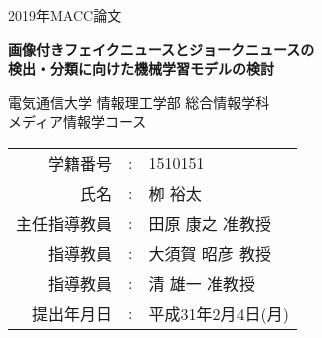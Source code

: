 \documentclass[a4paper,12pt,oneside,openany,uplatex]{jsbook}
\begin{document}
%
%
\frontmatter
\begin{titlepage}
  \vspace*{7mm}
  \begin{center}
    \Large{2019年MACC論文}\\

    \vspace{40truemm}

    \LARGE{\textbf{画像付きフェイクニュースとジョークニュースの\\検出・分類に向けた機械学習モデルの検討}}\\

    \vspace{30truemm}

    \Large{電気通信大学 情報理工学部 総合情報学科}\\
    \Large{メディア情報学コース}\\

    \vspace{15truemm}

    \begin{table*}[h]
        \centering
        \hspace*{4em}
        \begin{tabular}{rcl}
            \large{学籍番号}&\large{:}&\large{1510151} \\
            \large{氏名}&\large{:}&\large{栁 裕太} \vspace{5truemm} \\
            \large{主任指導教員}&\large{:}&\large{田原 康之 准教授} \vspace{5truemm} \\
            \large{指導教員}&\large{:}&\large{大須賀 昭彦 教授} \vspace{5truemm} \\
            \large{指導教員}&\large{:}&\large{清 雄一 准教授} \vspace{5truemm} \\
            \large{提出年月日}&\large{:}&\large{平成31年2月4日(月)} \\
        \end{tabular}
    \end{table*}
  \end{center}
\end{titlepage}
%


\tableofcontents
%
\mainmatter{}










\newpage
\printbibliography[title=参考文献]
%
%
%
\end{document}
